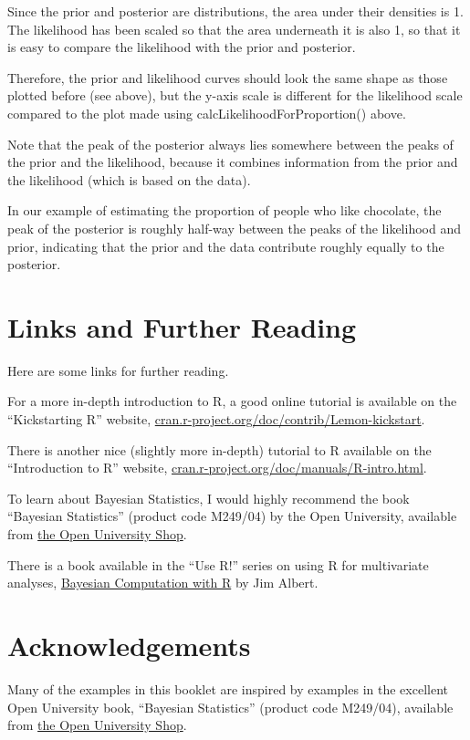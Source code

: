 \documentclass[a4paper,10pt,english]{sphinxmanual}
\begin{document}
Since the prior and posterior are distributions, the area under their densities is 1.
The likelihood has been scaled so that the area underneath it is also 1, so that it is
easy to compare the likelihood with the prior and posterior.

Therefore, the prior and likelihood curves should look the same shape as those plotted
before (see above), but the y-axis scale is different for the likelihood scale compared
to the plot made using calcLikelihoodForProportion() above.

Note that the peak of the posterior always lies somewhere between the peaks of the prior and the
likelihood, because it combines information from the prior and the likelihood (which is based on the data).

In our example of estimating the proportion of people who like chocolate,
the peak of the posterior is roughly half-way between the peaks of the likelihood and prior,
indicating that the prior and the data contribute roughly equally to the posterior.


\section{Links and Further Reading}
\label{src/bayesianstats:links-and-further-reading}
Here are some links for further reading.

For a more in-depth introduction to R, a good online tutorial is
available on the ``Kickstarting R'' website,
\href{http://cran.r-project.org/doc/contrib/Lemon-kickstart/}{cran.r-project.org/doc/contrib/Lemon-kickstart}.

There is another nice (slightly more in-depth) tutorial to R
available on the ``Introduction to R'' website,
\href{http://cran.r-project.org/doc/manuals/R-intro.html}{cran.r-project.org/doc/manuals/R-intro.html}.

To learn about Bayesian Statistics, I would highly recommend the book ``Bayesian
Statistics'' (product code M249/04) by the Open University, available from \href{http://www.ouw.co.uk/store/}{the Open University Shop}.

There is a book available in the ``Use R!'' series on using R for multivariate analyses,
\href{http://www.springer.com/statistics/statistical+theory+and+methods/book/978-0-387-92297-3}{Bayesian Computation with R} by Jim Albert.


\section{Acknowledgements}
\label{src/bayesianstats:acknowledgements}
Many of the examples in this booklet are inspired by examples in the excellent Open University book,
``Bayesian Statistics'' (product code M249/04),
available from \href{http://www.ouw.co.uk/store/}{the Open University Shop}.
\end{document}
